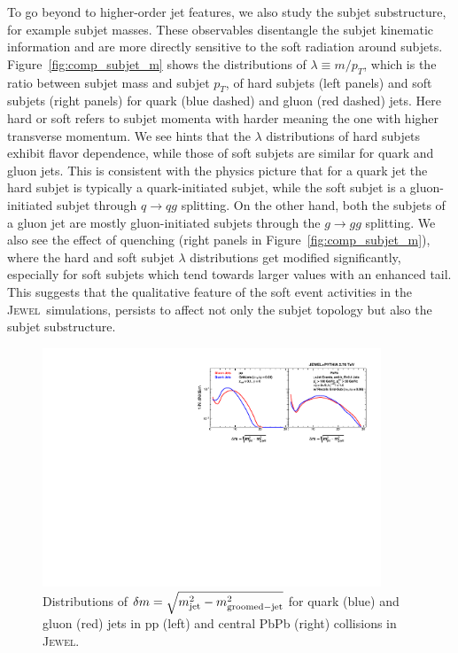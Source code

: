 \documentclass[notoc,preprintnumbers]{JHEP3}
\newcommand{\jw}{\textsc{Jewel}~}
\begin{document}
To go beyond to higher-order jet features, we also study the subjet substructure, for example subjet masses. These observables disentangle the subjet kinematic information and are more directly sensitive to the soft radiation around subjets. Figure~\ref{fig:comp_subjet_m} shows the distributions of $\lambda\equiv m/p_T$, which is the ratio between subjet mass and subjet $p_T$, of hard subjets (left panels) and soft subjets (right panels) for quark (blue dashed) and gluon (red dashed) jets. Here hard or soft refers to subjet momenta with harder meaning the one with higher transverse momentum. We see hints that the $\lambda$ distributions of hard subjets exhibit flavor dependence, while those of soft subjets are similar for quark and gluon jets. This is consistent with the physics picture that for a quark jet the hard subjet is typically a quark-initiated subjet, while the soft subjet is a gluon-initiated subjet through $q\rightarrow qg$ splitting. On the other hand, both the subjets of a gluon jet are mostly gluon-initiated subjets through the $g\rightarrow gg$ splitting. We also see the effect of quenching (right panels in Figure~\ref{fig:comp_subjet_m}), where the hard and soft subjet $\lambda$ distributions get modified significantly, especially for soft subjets which tend towards larger values with an enhanced tail. This suggests that the qualitative feature of the soft event activities in the \jw simulations, persists to affect not only the subjet topology but also the subjet substructure.

\begin{figure}[t]
	   \centering
	   \includegraphics[width=0.9\textwidth]{plots/Comp_delta_m2.pdf}
	   \caption{Distributions of $\delta m=\sqrt{m_{\rm jet}^2-m_{\rm groomed-jet}^2}$ for quark (blue) and gluon (red) jets in pp (left) and central PbPb (right) collisions in \textsc{Jewel}.}
\label{fig:comp_delta_m2}
\end{figure}
\end{document}
